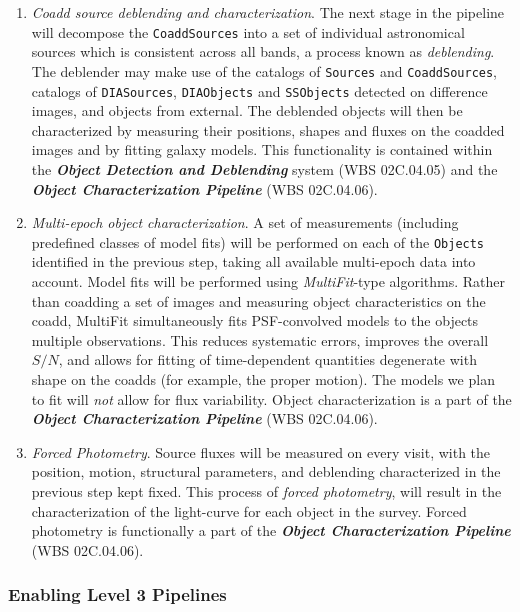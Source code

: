 \documentclass[12pt]{article}
\newcommand{\code}[1]{\texttt{#1}}
\newcommand{\DIASources}{\code{DIASources}\xspace}
\newcommand{\DIAObjects}{\code{DIAObjects}\xspace}
\newcommand{\Objects}{\code{Objects}\xspace}
\newcommand{\Sources}{\code{Sources}\xspace}
\newcommand{\CoaddSources}{\code{CoaddSources}\xspace}
\newcommand{\SSObjects}{\code{SSObjects}\xspace}
\newcommand{\wbsDetDeblend}{WBS 02C.04.05}
\newcommand{\wbsObjChar}{WBS 02C.04.06}
\begin{document}
\begin{enumerate}
    \item {\em Coadd source deblending and characterization}. The next stage in the pipeline will decompose the \CoaddSources into a set of individual astronomical sources which is consistent across all bands, a process known as {\em deblending}. The deblender may make use of the catalogs of \Sources and \CoaddSources, catalogs of \DIASources, \DIAObjects and \SSObjects detected on difference images, and objects from external. The deblended objects will then be characterized by measuring their positions, shapes and fluxes on the coadded images and by fitting galaxy models. This functionality is contained within the {\bf \em Object Detection and Deblending} system (\wbsDetDeblend) and the {\bf \em Object Characterization Pipeline} (\wbsObjChar).
    \item {\em Multi-epoch object characterization}. A set of measurements (including predefined classes of model fits) will be performed on each of the \Objects identified in the previous step, taking all available multi-epoch data into account. Model fits will be performed using {\em MultiFit}-type algorithms. Rather than coadding a set of images and measuring object characteristics on the coadd, MultiFit simultaneously fits PSF-convolved models to the objects multiple observations. This reduces systematic errors, improves the overall $S/N$, and allows for fitting of time-dependent quantities degenerate with shape on the coadds (for example, the proper motion). The models we plan to fit will {\em not} allow for flux variability. Object characterization is a part of the {\bf \em Object Characterization Pipeline} (\wbsObjChar).
    \item {\em Forced Photometry}. Source fluxes will be measured on every visit, with the position, motion, structural parameters, and deblending characterized in the previous step kept fixed.
      This process of {\em forced photometry}, will result in the characterization of the light-curve for each object in the survey. Forced photometry is functionally a part of the {\bf \em Object Characterization Pipeline} (\wbsObjChar).
\end{enumerate}



\subsubsection{Enabling Level 3 Pipelines}
\end{document}
